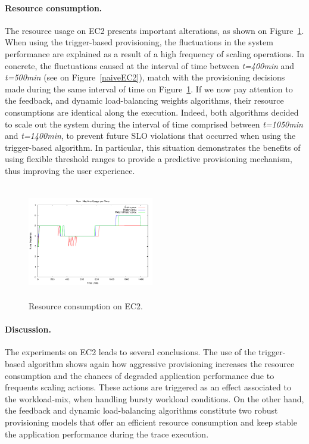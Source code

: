 \paragraph{Resource consumption.}

The resource usage on EC2 presents important alterations, as shown on Figure~\ref{resEC2}. When using the trigger-based provisioning, the fluctuations in the system performance are explained as a result of a high frequency of scaling operations. In concrete, the fluctuations caused at the interval of time between \emph{t=400min} and \emph{t=500min} (see on Figure~\ref{naiveEC2}), match with the provisioning decisions made during the same interval of time on Figure~\ref{resEC2}. If we now pay attention to the feedback, and dynamic load-balancing weights algorithms, their resource consumptions are identical along the execution. Indeed, both algorithms decided to scale out the system during the interval of time comprised between \emph{t=1050min} and \emph{t=1400min}, to prevent future SLO violations that occurred when using the trigger-based algorithm. In particular, this situation demonstrates the benefits of using flexible threshold ranges to provide a predictive provisioning mechanism, thus improving the user experience.


\begin{figure}
\begin{center}
\includegraphics[width=0.49\textwidth, height=5cm]{./images/heterogeneous/numMachinesCompEC2}
\end{center}
\caption{Resource consumption on EC2.}
\label{resEC2}
\end{figure}


\paragraph{Discussion.}
The experiments on EC2 leads to several conclusions. The use of the trigger-based algorithm shows again how aggressive provisioning increases the resource consumption and the chances of degraded application performance due to frequents scaling actions. These actions are triggered as an effect associated to the workload-mix, when handling bursty workload conditions. On the other hand, the feedback and dynamic load-balancing algorithms constitute two robust provisioning models that offer an efficient resource consumption and keep stable the application performance during the trace execution. 

